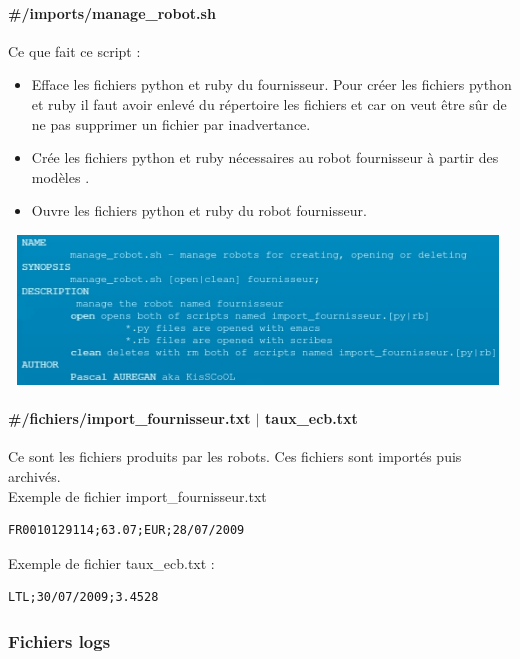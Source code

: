 \paragraph{{\#}/imports/manage{\_}robot.sh}
Ce que fait ce script :
\begin{itemize}
	\item Efface les fichiers python et ruby du fournisseur.
		Pour créer les fichiers python et ruby il faut avoir enlevé du répertoire  les fichiers  et  car on veut être sûr de ne pas supprimer un fichier par inadvertance.
	\item Crée les fichiers python et ruby nécessaires au robot fournisseur à partir des modèles .
	\item Ouvre les fichiers python et ruby du robot fournisseur.	
\end{itemize}
\includegraphics[clip=true, width=500px, height=150px]{./images/robot.jpg}\\
\paragraph{{\#}/fichiers/import{\_}fournisseur.txt $\vert$ taux{\_}ecb.txt}
\label{fichiers-flux}
Ce sont les fichiers produits par les robots.
Ces fichiers sont importés puis archivés.\\
Exemple de fichier import{\_}fournisseur.txt
\begin{lstlisting}
FR0010129114;63.07;EUR;28/07/2009
\end{lstlisting}
Exemple de fichier taux{\_}ecb.txt :
\begin{lstlisting}
LTL;30/07/2009;3.4528
\end{lstlisting}

\subsubsection{Fichiers logs}
